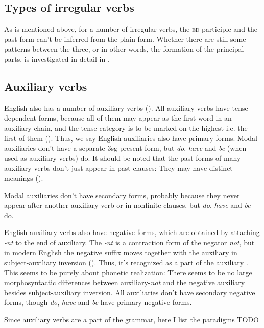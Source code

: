 \documentclass[UTF8, a4paper, oneside, scheme=plain]{ctexrep}
\newcommand*{\citepage}[1]{p.~{#1}}
\newcommand*{\citepages}[1]{pp.~{#1}}
\newcommand{\corpus}[1]{\emph{#1}}
\newcommand{\category}[1]{\textsc{#1}}
\begin{document}
\subsection{Types of irregular verbs}

As is mentioned above, for a number of irregular verbs,
the \category{ed}-participle and the past form can't be inferred from the plain form.
Whether there are still some patterns between the three,
or in other words,
the formation of the principal parts,
is investigated in detail in \citet[\citepages{105-120}]{quirk1985}.

\subsection{Auxiliary verbs}\label{sec:verb-inflection.auxiliary}

English also has a number of auxiliary verbs ().
All auxiliary verbs have tense-dependent forms,
because all of them may appear as the first word in an auxiliary chain,
and the tense category is to be marked on the highest i.e. the first of them ().
Thus, we say English auxiliaries also have primary forms.
Modal auxiliaries don't have a separate 3sg present form,
but \corpus{do}, \corpus{have} and \corpus{be} (when used as auxiliary verbs) do.
It should be noted that the past forms of many auxiliary verbs don't just appear in past clauses:
They may have distinct meanings ().

Modal auxiliaries don't have secondary forms,
probably because they never appear after another auxiliary verb 
or in nonfinite clauses,
but \corpus{do}, \corpus{have} and \corpus{be} do.

English auxiliary verbs also have negative forms,
which are obtained by attaching \corpus{-nt} to the end of auxiliary.
The \corpus{-nt} is a contraction form of the negator \corpus{not},
but in modern English the negative suffix moves together with the auxiliary in
subject-auxiliary inversion ().
Thus, it's recognized as a part of the auxiliary \citep[\citepage{91}]{cgel}.
This seems to be purely about phonetic realization:
There seems to be no large morphosyntactic differences 
between auxiliary-\corpus{not} and the negative auxiliary
besides subject-auxiliary inversion.
All auxiliaries don't have secondary negative forms,
though \corpus{do}, \corpus{have} and \corpus{be} have primary negative forms.

Since auxiliary verbs are a part of the grammar,
here I list the paradigms TODO
\end{document}
